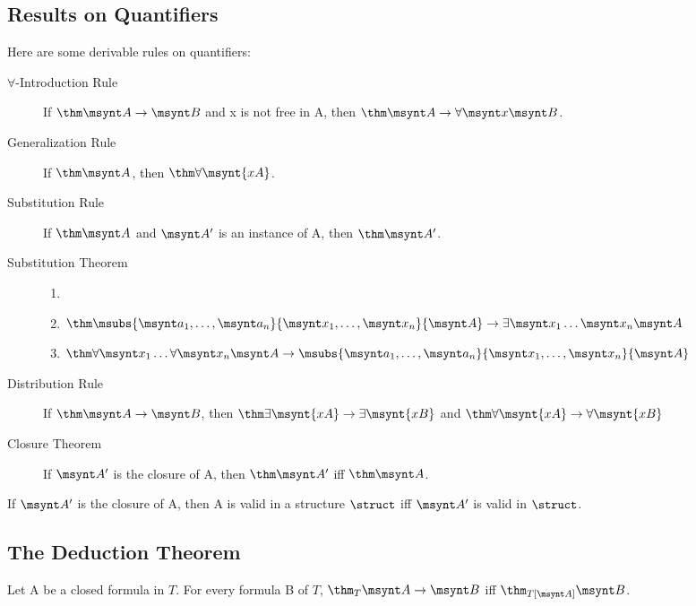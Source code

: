 \subsection{Results on Quantifiers}

\begin{fact}
	Here are some derivable rules on quantifiers:
	\begin{description}
		\item[$\forall$-Introduction Rule] If $\thm \msynt A \to \msynt B$ and
		\synt x is not free in \synt A, then $\thm \msynt A \to \forall \msynt x \msynt B$.
		\item[Generalization Rule] If $\thm \msynt A$, then $\thm \forall \msynt{xA}$.
		\item[Substitution Rule] If $\thm \msynt A$ and $\msynt A'$ is an instance
		of \synt A, then $\thm \msynt A'$.
		\item[Substitution Theorem] 
		\begin{enumerate}
			\item[]
			\item $\thm \msubs{\msynt a_1,\dots,\msynt a_n}{\msynt x_1,\dots,\msynt x_n}{\msynt A}\to
			\exists \msynt x_1\dots\msynt x_n\msynt A$
			\item $\thm \forall \msynt x_1\dots\forall\msynt x_n\msynt A\to
			\msubs{\msynt a_1,\dots,\msynt a_n}{\msynt x_1,\dots,\msynt x_n}{\msynt A}$	
		\end{enumerate}
		\item[Distribution Rule] If $\thm \msynt A \to \msynt B$, then
		$\thm \exists \msynt{xA}\to\exists\msynt{xB}$ and
		$\thm \forall \msynt{xA}\to\forall\msynt{xB}$
		\item[Closure Theorem] If $\msynt A'$ is the closure of \synt A, then 
		$\thm \msynt A'$ iff $\thm \msynt A$.
	\end{description}
\end{fact}

\begin{corollary}
	If $\msynt A'$ is the closure of \synt A, then \synt A is valid in a
	structure $\struct$ iff $\msynt A'$ is valid in $\struct$.
\end{corollary}

\subsection{The Deduction Theorem}

\begin{theorem}
	Let \synt A be a closed formula in $T$. For every formula \synt B
	of $T$, $\thm_T \msynt A\to\msynt B$ iff $\thm_{T[\msynt A]}\msynt B$.
\end{theorem}

